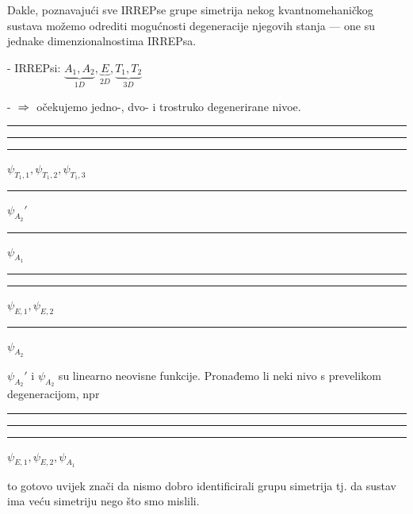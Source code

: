 Dakle, poznavajući sve IRREPse grupe simetrija nekog kvantnomehaničkog
sustava možemo odrediti mogućnosti degeneracije njegovih stanja ---
one su jednake dimenzionalnostima IRREPsa.

\begin{primjer}

- IRREPsi: $\underbrace{A_1, A_2}_{1D}, \underbrace{E}_{2D},
            \underbrace{T_1, T_2}_{3D}$

- $\;\Rightarrow\;$ očekujemo jedno-, dvo- i trostruko degenerirane nivoe.

\hspace*{2cm}
\rule{3cm}{1pt}\hspace*{-3cm}%
\rule[2pt]{3cm}{1pt}\hspace*{-3cm}%
\rule[4pt]{3cm}{1pt}\hspace{12pt}%
$\psi_{T_1,1}, \psi_{T_1,2}, \psi_{T_1,3}$

\hspace*{2cm}
\rule{3cm}{1pt}\hspace*{12pt}%
$\psi_{A_2}'$

\hspace*{2cm}
\rule{3cm}{1pt}\hspace*{12pt}%
$\psi_{A_1}$

\hspace*{2cm}
\rule{3cm}{1pt}\hspace*{-3cm}%
\rule[2pt]{3cm}{1pt}\hspace*{12pt}%
$\psi_{E,1}, \psi_{E,2}$

\hspace*{2cm}
\rule{3cm}{1pt}\hspace*{12pt}%
$\psi_{A_2}$

$\psi_{A_2}'$ i $\psi_{A_2}$ su linearno neovisne funkcije.
Pronađemo li neki nivo s prevelikom degeneracijom,
npr\\

\hspace*{2cm}
\rule{3cm}{1pt}\hspace*{-3cm}%
\rule[2pt]{3cm}{1pt}\hspace*{-3cm}%
\rule[4pt]{3cm}{1pt}\hspace{12pt}%
$\psi_{E,1}, \psi_{E,2}, \psi_{A_1}$

to gotovo uvijek znači da nismo dobro identificirali grupu simetrija
tj. da sustav ima veću simetriju nego što smo mislili.

\end{primjer}


